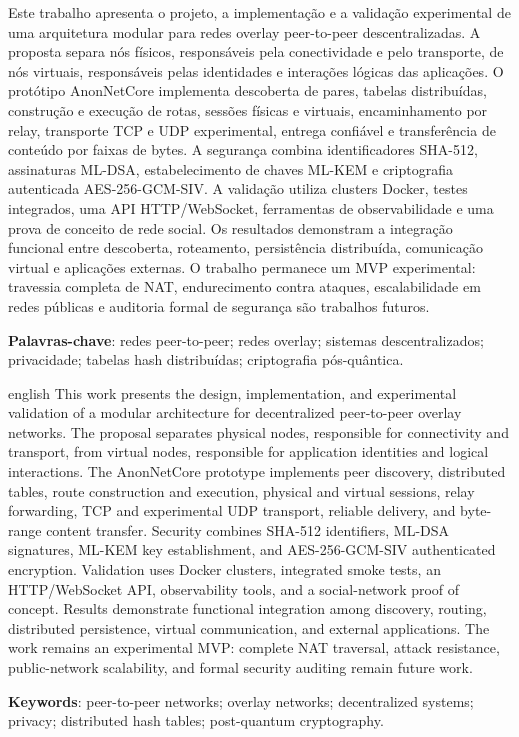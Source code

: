 \documentclass[
  12pt,
  oneside,
  a4paper,
  chapter=TITLE,
  section=TITLE,
  english,
  brazil
]{abntex2}
\begin{document}
\begin{resumo}
Este trabalho apresenta o projeto, a implementação e a validação experimental de uma arquitetura modular para redes overlay peer-to-peer descentralizadas. A proposta separa nós físicos, responsáveis pela conectividade e pelo transporte, de nós virtuais, responsáveis pelas identidades e interações lógicas das aplicações. O protótipo AnonNetCore implementa descoberta de pares, tabelas distribuídas, construção e execução de rotas, sessões físicas e virtuais, encaminhamento por relay, transporte TCP e UDP experimental, entrega confiável e transferência de conteúdo por faixas de bytes. A segurança combina identificadores SHA-512, assinaturas ML-DSA, estabelecimento de chaves ML-KEM e criptografia autenticada AES-256-GCM-SIV. A validação utiliza clusters Docker, testes integrados, uma API HTTP/WebSocket, ferramentas de observabilidade e uma prova de conceito de rede social. Os resultados demonstram a integração funcional entre descoberta, roteamento, persistência distribuída, comunicação virtual e aplicações externas. O trabalho permanece um MVP experimental: travessia completa de NAT, endurecimento contra ataques, escalabilidade em redes públicas e auditoria formal de segurança são trabalhos futuros.

\vspace{\onelineskip}
\noindent\textbf{Palavras-chave}: redes peer-to-peer; redes overlay; sistemas descentralizados; privacidade; tabelas hash distribuídas; criptografia pós-quântica.
\end{resumo}

\begin{resumo}[Abstract]
\begin{otherlanguage*}{english}
This work presents the design, implementation, and experimental validation of a modular architecture for decentralized peer-to-peer overlay networks. The proposal separates physical nodes, responsible for connectivity and transport, from virtual nodes, responsible for application identities and logical interactions. The AnonNetCore prototype implements peer discovery, distributed tables, route construction and execution, physical and virtual sessions, relay forwarding, TCP and experimental UDP transport, reliable delivery, and byte-range content transfer. Security combines SHA-512 identifiers, ML-DSA signatures, ML-KEM key establishment, and AES-256-GCM-SIV authenticated encryption. Validation uses Docker clusters, integrated smoke tests, an HTTP/WebSocket API, observability tools, and a social-network proof of concept. Results demonstrate functional integration among discovery, routing, distributed persistence, virtual communication, and external applications. The work remains an experimental MVP: complete NAT traversal, attack resistance, public-network scalability, and formal security auditing remain future work.

\vspace{\onelineskip}
\noindent\textbf{Keywords}: peer-to-peer networks; overlay networks; decentralized systems; privacy; distributed hash tables; post-quantum cryptography.
\end{otherlanguage*}
\end{resumo}
\end{document}
